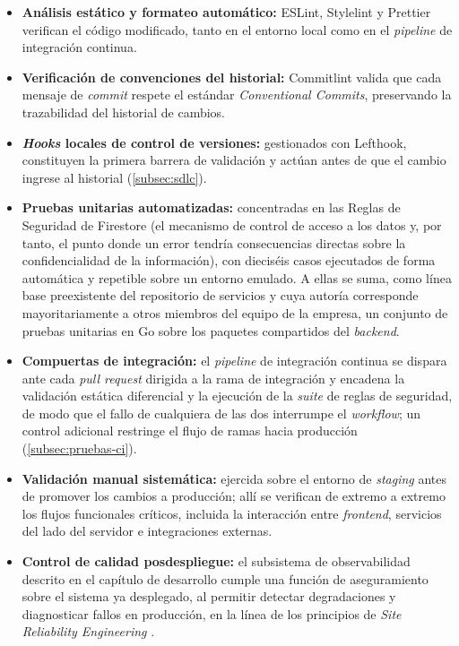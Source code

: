 \begin{itemize}
  \item \textbf{Análisis estático y formateo automático:} ESLint, Stylelint y Prettier verifican el código modificado, tanto en el entorno local como en el \textit{pipeline} de integración continua.

  \item \textbf{Verificación de convenciones del historial:} Commitlint valida que cada mensaje de \textit{commit} respete el estándar \textit{Conventional Commits}, preservando la trazabilidad del historial de cambios.

  \item \textbf{\textit{Hooks} locales de control de versiones:} gestionados con Lefthook, constituyen la primera barrera de validación y actúan antes de que el cambio ingrese al historial (\autoref{subsec:sdlc}).

  \item \textbf{Pruebas unitarias automatizadas:} concentradas en las Reglas de Seguridad de Firestore (el mecanismo de control de acceso a los datos y, por tanto, el punto donde un error tendría consecuencias directas sobre la confidencialidad de la información), con dieciséis casos ejecutados de forma automática y repetible sobre un entorno emulado. A ellas se suma, como línea base preexistente del repositorio de servicios y cuya autoría corresponde mayoritariamente a otros miembros del equipo de la empresa, un conjunto de pruebas unitarias en Go sobre los paquetes compartidos del \textit{backend}.

  \item \textbf{Compuertas de integración:} el \textit{pipeline} de integración continua se dispara ante cada \textit{pull request} dirigida a la rama de integración y encadena la validación estática diferencial y la ejecución de la \textit{suite} de reglas de seguridad, de modo que el fallo de cualquiera de las dos interrumpe el \textit{workflow}; un control adicional restringe el flujo de ramas hacia producción (\autoref{subsec:pruebas-ci}).

  \item \textbf{Validación manual sistemática:} ejercida sobre el entorno de \textit{staging} antes de promover los cambios a producción; allí se verifican de extremo a extremo los flujos funcionales críticos, incluida la interacción entre \textit{frontend}, servicios del lado del servidor e integraciones externas.

  \item \textbf{Control de calidad posdespliegue:} el subsistema de observabilidad descrito en el capítulo de desarrollo cumple una función de aseguramiento sobre el sistema ya desplegado, al permitir detectar degradaciones y diagnosticar fallos en producción, en la línea de los principios de \textit{Site Reliability Engineering} \cite{Beyer2016}.
\end{itemize}

